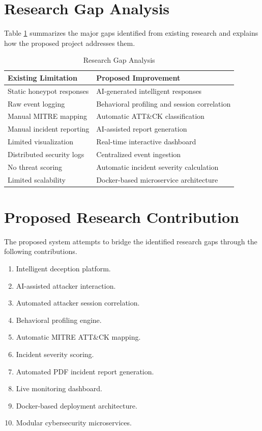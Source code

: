 \documentclass[12pt,a4paper]{report}
\begin{document}
\section{Research Gap Analysis}

Table \ref{tab:researchgap} summarizes the major gaps identified from existing research and explains how the proposed project addresses them.

\begin{table}[H]
\centering
\caption{Research Gap Analysis}
\label{tab:researchgap}
\begin{tabular}{|p{6cm}|p{7cm}|}
\hline
\textbf{Existing Limitation} & \textbf{Proposed Improvement} \\
\hline
Static honeypot responses & AI-generated intelligent responses \\
\hline
Raw event logging & Behavioral profiling and session correlation \\
\hline
Manual MITRE mapping & Automatic ATT\&CK classification \\
\hline
Manual incident reporting & AI-assisted report generation \\
\hline
Limited visualization & Real-time interactive dashboard \\
\hline
Distributed security logs & Centralized event ingestion \\
\hline
No threat scoring & Automatic incident severity calculation \\
\hline
Limited scalability & Docker-based microservice architecture \\
\hline
\end{tabular}
\end{table}


\section{Proposed Research Contribution}

The proposed system attempts to bridge the identified research gaps through the following contributions.

\begin{enumerate}
\item Intelligent deception platform.
\item AI-assisted attacker interaction.
\item Automated attacker session correlation.
\item Behavioral profiling engine.
\item Automatic MITRE ATT\&CK mapping.
\item Incident severity scoring.
\item Automated PDF incident report generation.
\item Live monitoring dashboard.
\item Docker-based deployment architecture.
\item Modular cybersecurity microservices.
\end{enumerate}
\end{document}
